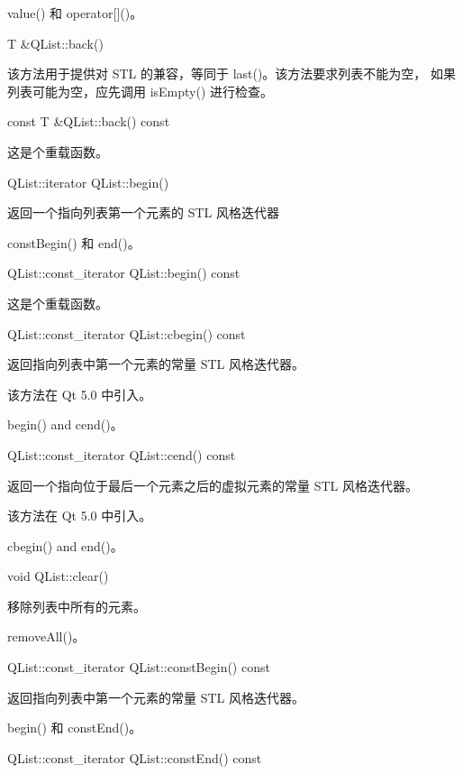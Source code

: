 \begin{seeAlso}
value() 和 operator[]()。
\end{seeAlso}

T \&QList::back()

该方法用于提供对 STL 的兼容，等同于 last()。该方法要求列表不能为空， 如果列表可能为空，应先调用 isEmpty() 进行检查。

const T \&QList::back() const

这是个重载函数。

QList::iterator QList::begin()

返回一个指向列表第一个元素的 STL 风格迭代器


\begin{seeAlso}
constBegin() 和 end()。
\end{seeAlso}


QList::const\_iterator QList::begin() const

这是个重载函数。

QList::const\_iterator QList::cbegin() const

返回指向列表中第一个元素的常量 STL 风格迭代器。

该方法在 Qt 5.0 中引入。


\begin{seeAlso}
begin() and cend()。
\end{seeAlso}


QList::const\_iterator QList::cend() const

返回一个指向位于最后一个元素之后的虚拟元素的常量 STL 风格迭代器。

该方法在 Qt 5.0 中引入。


\begin{seeAlso}
cbegin() and end()。
\end{seeAlso}

void QList::clear()

移除列表中所有的元素。



\begin{seeAlso}
removeAll()。
\end{seeAlso}


QList::const\_iterator QList::constBegin() const

返回指向列表中第一个元素的常量 STL 风格迭代器。


\begin{seeAlso}
begin() 和 constEnd()。
\end{seeAlso}


QList::const\_iterator QList::constEnd() const

